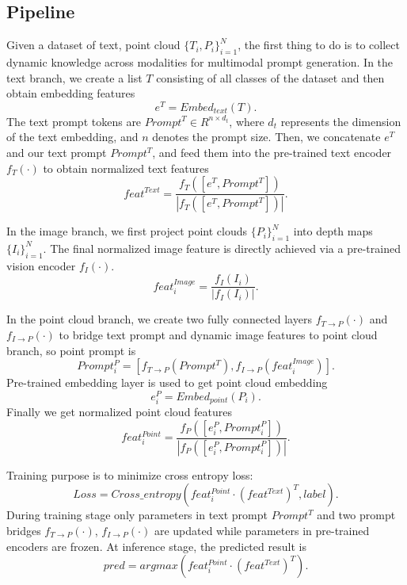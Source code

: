 \documentclass{ecai}
\begin{document}
\subsection{Pipeline} 
Given a dataset of text, point cloud $\{T_i, P_i\}_{i=1}^N$, the first thing to do is to collect dynamic knowledge across modalities for multimodal prompt generation. In the text branch, we create a list $T$ consisting of all classes of the dataset and then obtain embedding features \begin{equation}\label{eqn-4} e^T = Embed_{text}(T). \end{equation} The text prompt tokens are $Prompt^T \in R^{n \times d_t}$, where $d_t$ represents the dimension of the text embedding, and $n$ denotes the prompt size. Then, we concatenate $e^T$ and our text prompt $Prompt^T$, and feed them into the pre-trained text encoder $f_T(\cdot)$ to obtain normalized text features \begin{equation}\label{eqn-5} feat^{Text} = \frac{f_T([e^T ,Prompt^T])}{|f_T([e^T ,Prompt^T])|}.\end{equation} 

In the image branch, we first project point clouds $\{P_i\}_{i=1}^N$ into depth maps $\{ I_i\}_{i=1}^N $. The final normalized image feature is directly achieved via a pre-trained vision encoder $f_I(\cdot)$. \begin{equation}\label{eqn-6} feat_i^{Image} = \frac{f_I(I_i)}{|f_I(I_i)|}.\end{equation} 

In the point cloud branch, we create two fully connected layers $f_{T \rightarrow P}(\cdot)$ and $f_{I \rightarrow P}(\cdot)$ to bridge text prompt and dynamic image features to point cloud branch, so point prompt is \begin{equation}\label{eqn-7} Prompt^P_i = [f_{T \rightarrow P}(Prompt^T),f_{I \rightarrow P}(feat_i^{Image})].\end{equation} Pre-trained embedding layer is used to get point cloud embedding \begin{equation}\label{eqn-8} e^P_i = Embed_{point}(P_i).\end{equation} Finally we get normalized point cloud features \begin{equation}\label{eqn-9} feat_i^{Point} = \frac{f_P([e^P_i,Prompt^P_i])}{|f_P([e^P_i,Prompt^P_i])|}.\end{equation}

Training purpose is to minimize cross entropy loss:\begin{equation}\label{eqn-10} Loss = Cross\_entropy(feat_i^{Point}\cdot( feat^{Text})^T,label).\end{equation} During training stage only parameters in text prompt $Prompt^T$ and two prompt bridges  $f_{T \rightarrow P}(\cdot)$, $f_{I \rightarrow P}(\cdot)$ are updated while parameters in pre-trained encoders are frozen. At inference stage, the predicted result is \begin{equation}\label{eqn-11} pred = argmax(feat_i^{Point}\cdot( feat^{Text})^T).\end{equation}
\end{document}
